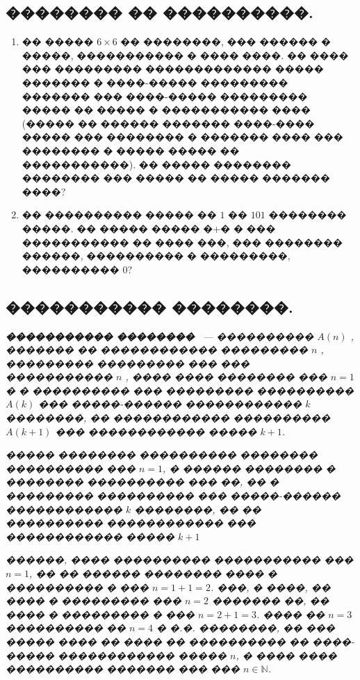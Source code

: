 \documentclass[a4paper,12pt]{article}
\begin{document}
\newpage

\begin{center}
\section*{�������� �� ����������.}
\end{center}

\medskip\medskip\medskip

\begin{enumerate}
\item �� ����� $6 \times 6$ �� ��������, ��� ������ � �����, ����������� � ���� ����. �� ���� ��� ��������� ������������� ����� ������� � ����-����� ��������� ������� ��� ����-����� ��������� ����� �� ����� � ����������� ���� (����� �� ������ ������� ����-���� ����� ��� �������� � ������� ���� ��� �������� � ����� ����� �� �����������). �� ����� �������� �������� ��� ����� �� ����� ������� ����?

\item �� ���������� ����� �� $1$ �� $101$ �������� �����. �� ����� ����� �+� � ��� ����������� �� ���� ���, ��� �������� ������, ���������� � ���������, ���������� 0?

\end{enumerate}




\newpage

\begin{center}
\section*{����������� ��������.}
\end{center}

\textit{\textbf{����������� ��������} ~--- ���������� $A(n)$ , ������� �� ������������ ��������� $n$ , ��������� ��������� ��� ��� ����������� $n$ , ���� ���� �������� ��� $n =1$ � � ���������� ��� ��������� ���������� $A(k)$ ��� �����-������ ������������ $k$ ��������, �� ������������ ���������� $A(k+1)$ ��� ������������ ����� $k+1$.\\}

\textit{����� �������� ���������� �������� ���������� ��� $n =1$, � ������ �������� � �������� ���������� ��� ��, �� � ��������� ���������� ��� �����-������ ������������ $k$ ��������, �� �� ���������� ������������ ��� ������������ ����� $k+1$}

\textit{������, ���� ���������� ����������� ��� $n =1$, �� ��
������ �������� ���� � ���������� � ��� $n = 1 + 1 = 2$. ���, � ����, �� ����
� ��������� ��� $n = 2$ ������� ��, �� ���� � ��������� � ��� $n = 2 +1 = 3$. ���� �� $n = 3$
���������� �� $n = 4$ � �.�. ��������, �� ��� ����� ���� �� ���� �� ���������� ��
����-����� ������������ ����� $n$, � ���� ���� ���������� ������� ��� ���
$n\in \mathbb{N}$.}
\end{document}
